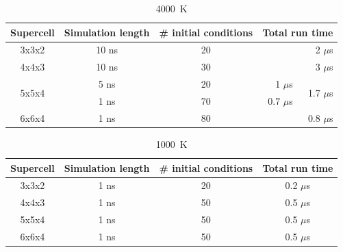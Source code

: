 \begin{table}[h]

\centering
\caption[CONTENTS1]{4000~K}%

\begin{tabular}{cccrr}
Supercell                        & Simulation length & \# initial conditions & \multicolumn{2}{c}{Total run time}           \\ \hline
3x3x2                             & 10 ns                     & 20                             & \multicolumn{2}{r}{2 $\mu$s}   \\ \hline
4x4x3                             & 10 ns                     & 30                             & \multicolumn{2}{r}{3 $\mu$s}               \\ \hline
\multirow{2}{*}{5x5x4} & 5 ns                       & 20                             & 1 $\mu$s     & \multirow{2}{*}{1.7 $\mu$s} \\
                                       & 1 ns                       & 70                              & 0.7 $\mu$s &                               \\ \hline
6x6x4                            & 1 ns                       & 80                              & \multicolumn{2}{r}{0.8 $\mu$s}            
\end{tabular}

\label{tab:gk_fse_times_4K}
\end{table}




\begin{table}[h]

\centering
\caption[CONTENTS2]{1000~K}%

\begin{tabular}{cccc}
Supercell                        & Simulation length & \# initial conditions    & Total run time           \\ \hline
3x3x2                             & 1 ns                        & 20                                & 0.2 $\mu$s               \\ \hline
4x4x3                             & 1 ns                        & 50                                & 0.5 $\mu$s               \\ \hline
5x5x4                             & 1 ns                        & 50                                & 0.5 $\mu$s               \\ \hline
6x6x4                             & 1 ns                        & 50                                & 0.5 $\mu$s            
\end{tabular}

\label{tab:gk_fse_times_1K}

\end{table}





